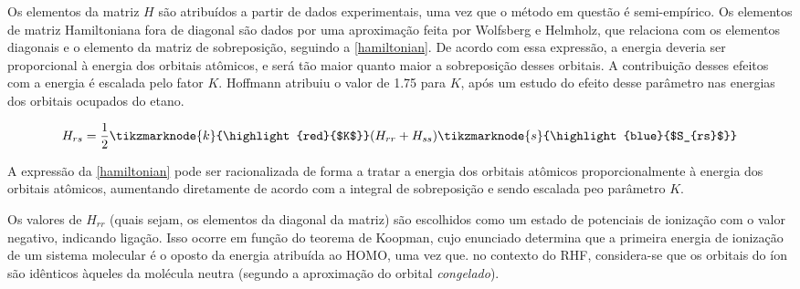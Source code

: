 Os elementos da matriz $H$ são atribuídos a partir de dados experimentais, uma vez que o método em questão é semi-empírico. Os elementos de matriz Hamiltoniana fora de diagonal são dados por uma aproximação feita por Wolfsberg e Helmholz, que relaciona com os elementos diagonais e o elemento da matriz de sobreposição, seguindo a \autoref{hamiltonian}. De acordo com essa expressão, a energia deveria ser proporcional à energia dos orbitais atômicos, e será tão maior quanto maior a sobreposição desses orbitais. A contribuição desses efeitos com a energia é escalada pelo fator $K$. Hoffmann \autocite{Hoffmann1963} atribuiu o valor de 1.75 para $K$, após um estudo do efeito desse parâmetro nas energias dos orbitais ocupados do etano.

\begin{figure}[htb]
\label{hamiltonian}
    \vspace{2\baselineskip}
\begin{equation}
    H_{rs} = \frac{1}{2} \tikzmarknode{k}{\highlight{red}{$K$}}(H_{rr} + H_{ss}) \tikzmarknode{s}{\highlight{blue}{$S_{rs}$}}
\end{equation}
\end{figure}

A expressão da \autoref{hamiltonian} pode ser racionalizada de forma a tratar a energia dos orbitais atômicos proporcionalmente à energia dos orbitais atômicos, aumentando diretamente de acordo com a integral de sobreposição e sendo escalada peo parâmetro $K$.

 Os valores de $H_{rr}$ (quais sejam, os elementos da diagonal da matriz) são escolhidos como um estado de potenciais de ionização com o valor negativo, indicando ligação. Isso ocorre em função do teorema de Koopman\autocite{Koopmans1934}, cujo enunciado determina que a primeira energia de ionização de um sistema molecular é o oposto da energia atribuída ao \gls{HOMO}, uma vez que. no contexto do \gls{RHF}, considera-se que os orbitais do íon são idênticos àqueles da molécula neutra (segundo a aproximação do orbital \textit{congelado}). 

